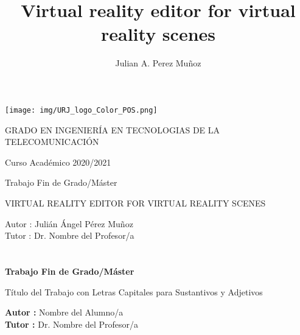 \documentclass[a4paper, 12pt]{book}
\title{Virtual reality editor for virtual reality scenes}
\author{Julian A. Perez Muñoz}
\begin{document}
\renewcommand{\refname}{Bibliografía}  %
\renewcommand{\appendixname}{Apéndice}


\begin{titlepage}
\begin{center}
\texttt{[image: img/URJ\_logo\_Color\_POS.png]}

\vspace{1.75cm}

\Large
GRADO EN INGENIERÍA EN TECNOLOGIAS DE LA TELECOMUNICACIÓN

\vspace{0.4cm}

\large
Curso Académico 2020/2021

\vspace{0.8cm}

Trabajo Fin de Grado/Máster

\vspace{2.5cm}

\LARGE
VIRTUAL REALITY EDITOR FOR VIRTUAL REALITY SCENES

\vspace{4cm}

\large
Autor : Julián Ángel Pérez Muñoz\\
Tutor : Dr. Nombre del Profesor/a
\end{center}
\end{titlepage}

\newpage
\mbox{}
\thispagestyle{empty} %


\clearpage
{}
\chapter*{}

\vspace{-4cm}
\begin{center}
\LARGE
\textbf{Trabajo Fin de Grado/Máster}

\vspace{1cm}
\large
Título del Trabajo con Letras Capitales para Sustantivos y Adjetivos

\vspace{1cm}
\large
\textbf{Autor :} Nombre del Alumno/a \\
\textbf{Tutor :} Dr. Nombre del Profesor/a

\end{center}
\end{document}
